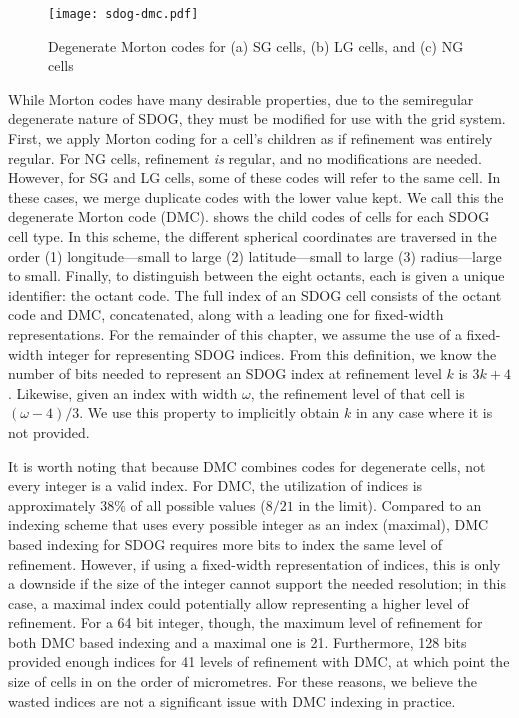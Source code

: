 \begin{figure}[ht!]
	\centering
	\texttt{[image: sdog-dmc.pdf]}
	\caption[Degenerate Morton codes for the different SDOG cell types]{
		Degenerate Morton codes for (a) SG cells, (b) LG cells, and (c) NG cells
	}
	\label{fig:sdog-dmc}
\end{figure}


While Morton codes have many desirable properties, due to the semiregular degenerate nature of SDOG, they must be modified for use with the grid system.
First, we apply Morton coding for a cell's children as if refinement was entirely regular.
For NG cells, refinement \textit{is} regular, and no modifications are needed.
However, for SG and LG cells, some of these codes will refer to the same cell.
In these cases, we merge duplicate codes with the lower value kept.
We call this the degenerate Morton code (DMC).
 shows the child codes of cells for each SDOG cell type.
In this scheme, the different spherical coordinates are traversed in the order (1) longitude---small to large (2) latitude---small to large (3) radius---large to small.
Finally, to distinguish between the eight octants, each is given a unique identifier: the octant code.
The full index of an SDOG cell consists of the octant code and DMC, concatenated, along with a leading one for fixed-width representations.
For the remainder of this chapter, we assume the use of a fixed-width integer for representing SDOG indices.
From this definition, we know the number of bits needed to represent an SDOG index at refinement level $k$ is $3k + 4$.
Likewise, given an index with width $\omega$, the refinement level of that cell is $(\omega - 4) / 3$.
We use this property to implicitly obtain $k$ in any case where it is not provided.


It is worth noting that because DMC combines codes for degenerate cells, not every integer is a valid index.
For DMC, the utilization of indices is approximately 38\% of all possible values ($8/21$ in the limit).
Compared to an indexing scheme that uses every possible integer as an index (maximal), DMC based indexing for SDOG requires more bits to index the same level of refinement.
However, if using a fixed-width representation of indices, this is only a downside if the size of the integer cannot support the needed resolution; in this case, a maximal index could potentially allow representing a higher level of refinement.
For a 64 bit integer, though, the maximum level of refinement for both DMC based indexing and a maximal one is 21.
Furthermore, 128 bits provided enough indices for 41 levels of refinement with DMC, at which point the size of cells in on the order of micrometres.
For these reasons, we believe the wasted indices are not a significant issue with DMC indexing in practice.


